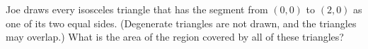Joe draws every isosceles triangle that has the segment from $(0,0)$ to $(2,0)$ as one of its two equal sides. (Degenerate triangles are not drawn, and the triangles may overlap.) What is the area of the region covered by all of these triangles?
